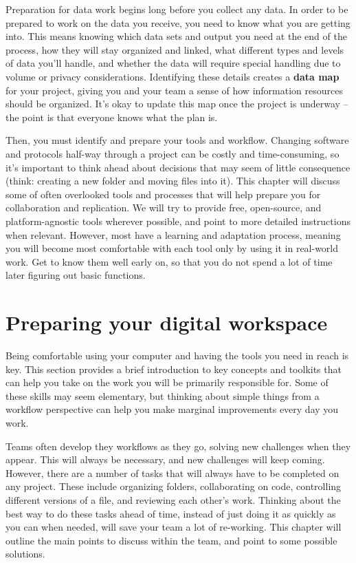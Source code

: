
\begin{fullwidth}
Preparation for data work begins long before you collect any data.
In order to be prepared to work on the data you receive, 
you need to know what you are getting into.
This means knowing which data sets and output you need at the end of the process,
how they will stay organized and linked,
what different types and levels of data you'll handle,
and whether the data will require special handling due to volume or privacy considerations.
Identifying these details creates a \textbf{data map} for your project,
giving you and your team a sense of how information resources should be organized.
It's okay to update this map once the project is underway --
the point is that everyone knows what the plan is.

Then, you must identify and prepare your tools and workflow.
Changing software and protocols half-way through a project can be costly and time-consuming,
so it's important to think ahead about decisions that may seem of little consequence
(think: creating a new folder and moving files into it).
This chapter will discuss some of often overlooked tools and processes that
will help prepare you for collaboration and replication.
We will try to provide free, open-source, and platform-agnostic tools wherever possible,
and point to more detailed instructions when relevant.
However, most have a learning and adaptation process,
meaning you will become most comfortable with each tool
only by using it in real-world work.
Get to know them well early on,
so that you do not spend a lot of time later figuring out basic functions.
\end{fullwidth}



\section{Preparing your digital workspace}

Being comfortable using your computer and having the tools you need in reach is key.
This section provides a brief introduction to key concepts and toolkits
that can help you take on the work you will be primarily responsible for.
Some of these skills may seem elementary,
but thinking about simple things from a workflow perspective
can help you make marginal improvements every day you work.

Teams often develop they workflows as they go,
solving new challenges when they appear.
This will always be necessary,
and new challenges will keep coming.
However, there are a number of tasks that will always have to be completed on any project.
These include organizing folders,
collaborating on code,
controlling different versions of a file,
and reviewing each other's work.
Thinking about the best way to do these tasks ahead of time,
instead of just doing it as quickly as you can when needed,
will save your team a lot of re-working.
This chapter will outline the main points to discuss within the team,
and point to some possible solutions.

